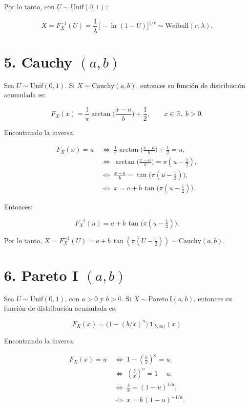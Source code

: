 \documentclass[10pt,a4paper]{article}
\begin{document}
Por lo tanto, con \(U\sim\mathrm{Unif}(0,1)\):

\[
X=F_X^{-1}(U)=\frac{1}{\lambda}\,\bigl[-\ln(1-U)\bigr]^{1/r}\sim\mathrm{Weibull}(r,\lambda).
\]

    \hypertarget{cauchy-ab}{%
\section{\texorpdfstring{5. Cauchy
\((a,b)\)}{5. Cauchy (a,b)}}\label{cauchy-ab}}

    Sea \textbf{\(U\sim\mathrm{Unif}(0,1)\)}. Si
\(X\sim\mathrm{Cauchy}(a,b)\), entonces su función de distribución
acumulada es:

\[
F_X(x)=\frac{1}{\pi}\arctan\!\Big(\frac{x-a}{b}\Big)+\frac{1}{2},\qquad x\in\mathbb{R},\; b>0.
\]

Encontrando la inversa:

\[
\begin{aligned}
F_X(x)=u 
&\;\iff\; \frac{1}{\pi}\arctan\!\Big(\frac{x-a}{b}\Big)+\frac{1}{2}=u,\\
&\;\iff\; \arctan\!\Big(\frac{x-a}{b}\Big)=\pi\!\left(u-\tfrac{1}{2}\right),\\
&\;\iff\; \frac{x-a}{b}=\tan\!\big(\pi(u-\tfrac{1}{2})\big),\\
&\;\iff\; x=a+b\,\tan\!\big(\pi(u-\tfrac{1}{2})\big).
\end{aligned}
\]

Entonces:

\[
F_X^{-1}(u)=a+b\,\tan\!\big(\pi(u-\tfrac{1}{2})\big).
\]

Por lo tanto,
\(X=F_X^{-1}(U)=a+b\,\tan(\pi(U-\tfrac{1}{2}))\sim\mathrm{Cauchy}(a,b)\).

    \hypertarget{pareto-i-ab}{%
\section{\texorpdfstring{6. Pareto I
\((a,b)\)}{6. Pareto I (a,b)}}\label{pareto-i-ab}}

    Sea \textbf{\(U\sim\mathrm{Unif}(0,1)\)}, con \(a>0\) y \(b>0\). Si
\(X\sim\mathrm{Pareto\ I}(a,b)\), entonces su función de distribución
acumulada es:

\[
F_X(x)=\bigl(1-(b/x)^a\bigr)\,\mathbf{1}_{[b,\infty)}(x)
\]

Encontrando la inversa:

\[
\begin{aligned}
F_X(x)=u &\;\iff\; 1-\left(\frac{b}{x}\right)^a=u,\\
         &\;\iff\; \left(\frac{b}{x}\right)^a=1-u,\\
         &\;\iff\; \frac{b}{x}=(1-u)^{1/a},\\
         &\;\iff\; x=b\,(1-u)^{-1/a}.
\end{aligned}
\]
\end{document}
